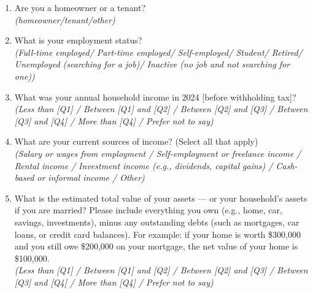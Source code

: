 \documentclass[11pt]{article}
\begin{document}
\begin{enumerate}
    \item Are you a homeowner or a tenant? \\ \textit{(homeowner/tenant/other)}
    \item What is your employment status? \\ \textit{(Full-time employed/ Part-time employed/ Self-employed/ Student/ Retired/ Unemployed (searching for a job)/ Inactive (no job and not searching for one))}
    \item What was your annual household income in 2024 [before withholding tax]?\\ 
    \textit{(Less than [Q1] / Between [Q1] and [Q2] / Between [Q2] and [Q3] / Between [Q3] and [Q4] / More than [Q4] / Prefer not to say)}
    \item What are your current sources of income? (Select all that apply)\\
    \textit{(Salary or wages from employment / Self-employment or freelance income / Rental income / Investment income (e.g., dividends, capital gains) / Cash-based or informal income / Other)}
    \item What is the estimated total value of your assets — or your household’s assets if you are married? Please include everything you own (e.g., home, car, savings, investments), minus any outstanding debts (such as mortgages, car loans, or credit card balances). For example: if your home is worth \$300,000 and you still owe \$200,000 on your mortgage, the net value of your home is \$100,000.\\
    \textit{(Less than [Q1] / Between [Q1] and [Q2] / Between [Q2] and [Q3] / Between [Q3] and [Q4] / More than [Q4] / Prefer not to say)}
\end{enumerate}
\end{document}
